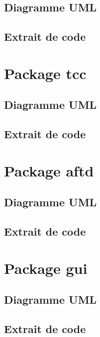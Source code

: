 \documentclass[11pt]{report}
\begin{document}
		\subsection{Diagramme UML}
		\subsection{Extrait de code}
		
	\section{Package tcc}
		\subsection{Diagramme UML}
		\subsection{Extrait de code}
		
	\section{Package aftd}
		\subsection{Diagramme UML}
		\subsection{Extrait de code}
		
	\section{Package gui}
		\subsection{Diagramme UML}
		\subsection{Extrait de code}
		
\end{document}

